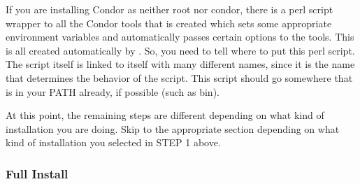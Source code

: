 \begin{description}
     If you are installing Condor as neither root nor condor, there is
     a perl script wrapper to all the Condor tools that is created
     which sets some appropriate environment variables and
     automatically passes certain options to the tools.  This is all
     created automatically by .  So, you need to tell
      where to put this perl script.  The script itself
     is linked to itself with many different names, since it is the
     name that determines the behavior of the script.  This script
     should go somewhere that is in your PATH already, if possible
     (such as \Tilde bin).

\end{description}

At this point, the remaining steps are different depending on what
kind of installation you are doing.  Skip to the appropriate section
depending on what kind of installation you selected in STEP 1 above.

\subsubsection{Full Install}


